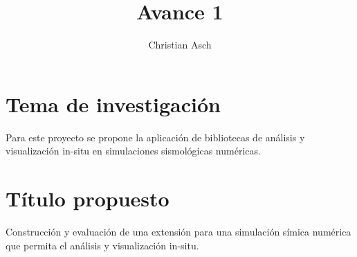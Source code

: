 \documentclass{article}
\begin{document}
\title{Avance 1}
\author{Christian Asch}
\date{}
\maketitle

\section{Tema de investigación}
 Para este proyecto se propone la aplicación de bibliotecas de análisis y visualización in-situ en simulaciones sismológicas numéricas.
\section{Título propuesto}
Construcción y evaluación de una extensión para una simulación símica numérica que permita el análisis y visualización in-situ.
\end{document}
